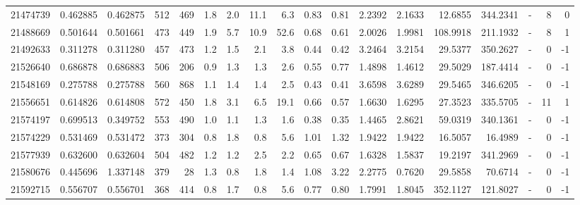 \begin{tabular}{rrrrrrrrrrrrrrrlrr}
  21474739 & 0.462885 &   0.462875 &  512 &  469 &      1.8 &      2.0 &    11.1 &      6.3 &       0.83 &        0.81 &  2.2392 &  2.1633 &   12.6855 &  344.2341 &             - &        8 &          0 \\
  21488669 & 0.501644 &   0.501661 &  473 &  449 &      1.9 &      5.7 &    10.9 &     52.6 &       0.68 &        0.61 &  2.0026 &  1.9981 &  108.9918 &  211.1932 &             - &        8 &          1 \\
  21492633 & 0.311278 &   0.311280 &  457 &  473 &      1.2 &      1.5 &     2.1 &      3.8 &       0.44 &        0.42 &  3.2464 &  3.2154 &   29.5377 &  350.2627 &             - &        0 &         -1 \\
  21526640 & 0.686878 &   0.686883 &  506 &  206 &      0.9 &      1.3 &     1.3 &      2.6 &       0.55 &        0.77 &  1.4898 &  1.4612 &   29.5029 &  187.4414 &             - &        0 &         -1 \\
  21548169 & 0.275788 &   0.275788 &  560 &  868 &      1.1 &      1.4 &     1.4 &      2.5 &       0.43 &        0.41 &  3.6598 &  3.6289 &   29.5465 &  346.6205 &             - &        0 &         -1 \\
  21556651 & 0.614826 &   0.614808 &  572 &  450 &      1.8 &      3.1 &     6.5 &     19.1 &       0.66 &        0.57 &  1.6630 &  1.6295 &   27.3523 &  335.5705 &             - &       11 &          1 \\
  21574197 & 0.699513 &   0.349752 &  553 &  490 &      1.0 &      1.1 &     1.3 &      1.6 &       0.38 &        0.35 &  1.4465 &  2.8621 &   59.0319 &  340.1361 &             - &        0 &         -1 \\
  21574229 & 0.531469 &   0.531472 &  373 &  304 &      0.8 &      1.8 &     0.8 &      5.6 &       1.01 &        1.32 &  1.9422 &  1.9422 &   16.5057 &   16.4989 &             - &        0 &         -1 \\
  21577939 & 0.632600 &   0.632604 &  504 &  482 &      1.2 &      1.2 &     2.5 &      2.2 &       0.65 &        0.67 &  1.6328 &  1.5837 &   19.2197 &  341.2969 &             - &        0 &         -1 \\
  21580676 & 0.445696 &   1.337148 &  379 &   28 &      1.3 &      0.8 &     1.8 &      1.4 &       1.08 &        3.22 &  2.2775 &  0.7620 &   29.5858 &   70.6714 &             - &        0 &         -1 \\
  21592715 & 0.556707 &   0.556701 &  368 &  414 &      0.8 &      1.7 &     0.8 &      5.6 &       0.77 &        0.80 &  1.7991 &  1.8045 &  352.1127 &  121.8027 &             - &        0 &         -1 \\

\end{tabular}
